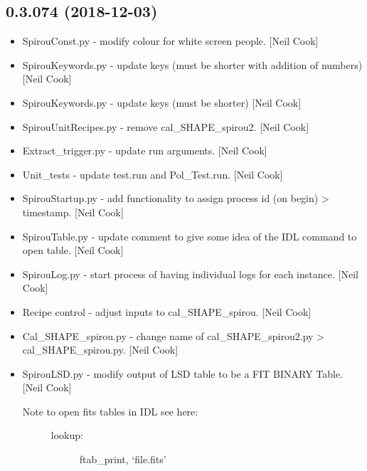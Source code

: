 \documentclass[a4paper,10pt,english]{report}
\begin{document}
\subsection{0.3.074 (2018-12-03)}
\label{\detokenize{misc/changelog:id247}}\begin{itemize}
\item {} 
SpirouConst.py - modify colour for white screen people. {[}Neil Cook{]}

\item {} 
SpirouKeywords.py - update keys (must be shorter with addition of
numbers) {[}Neil Cook{]}

\item {} 
SpirouKeywords.py - update keys (must be shorter) {[}Neil Cook{]}

\item {} 
SpirouUnitRecipes.py - remove cal\_SHAPE\_spirou2. {[}Neil Cook{]}

\item {} 
Extract\_trigger.py - update run arguments. {[}Neil Cook{]}

\item {} 
Unit\_tests - update test.run and Pol\_Test.run. {[}Neil Cook{]}

\item {} 
SpirouStartup.py - add functionality to assign process id (on begin)
\textendash{}\textgreater{} timestamp. {[}Neil Cook{]}

\item {} 
SpirouTable.py - update comment to give some idea of the IDL command
to open table. {[}Neil Cook{]}

\item {} 
SpirouLog.py - start process of having individual logs for each
instance. {[}Neil Cook{]}

\item {} 
Recipe control - adjust inputs to cal\_SHAPE\_spirou. {[}Neil Cook{]}

\item {} 
Cal\_SHAPE\_spirou.py - change name of cal\_SHAPE\_spirou2.py \textendash{}\textgreater{}
cal\_SHAPE\_spirou.py. {[}Neil Cook{]}

\item {} 
SpirouLSD.py - modify output of LSD table to be a FIT BINARY Table.
{[}Neil Cook{]}
\begin{description}
\item[{Note to open fits tables in IDL see here:}] \leavevmode
{}
\begin{description}
\item[{lookup:}] \leavevmode
ftab\_print, ‘file.fits’


\end{description}
\end{description}
\end{itemize}
\end{document}
